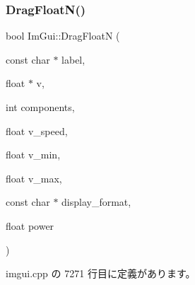 \subsubsection{\texorpdfstring{Drag\+Float\+N()}{DragFloatN()}}
{\footnotesize\ttfamily bool Im\+Gui\+::\+Drag\+FloatN (\begin{DoxyParamCaption}\item[{const char $\ast$}]{label,  }\item[{float $\ast$}]{v,  }\item[{int}]{components,  }\item[{float}]{v\+\_\+speed,  }\item[{float}]{v\+\_\+min,  }\item[{float}]{v\+\_\+max,  }\item[{const char $\ast$}]{display\+\_\+format,  }\item[{float}]{power }\end{DoxyParamCaption})}



 imgui.\+cpp の 7271 行目に定義があります。

